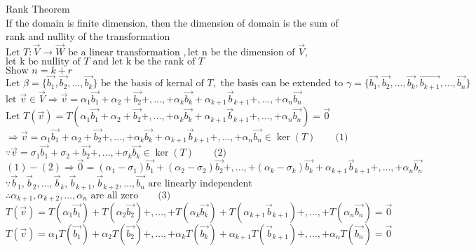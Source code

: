\documentclass{book}
\begin{document}
\noindent
Rank Theorem\\
If the domain is finite dimension, then the dimension of domain is the sum of rank and nullity of the transformation\\
$\text{Let } T:\vec{V} \rightarrow \vec{W} \text{ be a linear transformation },\text{let n be the dimension of }\vec{V},$\\
$\text{let k be nullity of }T \text{ and let k be the rank of }T$\\
$\text{Show } n = k + r$\\

$\text{Let }\beta = \{ \vec{b_1}, \vec{b_2},...,\vec{b_k}\} \text{ be the basis of kernal of }T, \text{ the basis can be extended to } \gamma = \{ \vec{b_1}, \vec{b_2},...,\vec{b_k}, \vec{b_{k+1}},...,\vec{b_n}\}$\\
$\text{let }\vec{v} \in \vec{V} \Rightarrow \vec{v} = \alpha_1 \vec{b_1} + \alpha_2 + \vec{b_2} +,..., + \alpha_k \vec{b_k} + \alpha_{k+1}\vec{b}_{k+1}+,...,+\alpha_{n}\vec{b_n}$\\
$\text{Let }T(\vec{v}) = T(\alpha_1 \vec{b_1} + \alpha_2 + \vec{b_2} +,..., + \alpha_k \vec{b_k} + \alpha_{k+1}\vec{b}_{k+1}+,...,+\alpha_{n}\vec{b_n}) = \vec{0}$\\
$\Rightarrow \vec{v} = \alpha_1 \vec{b_1} + \alpha_2 + \vec{b_2} +,..., + \alpha_k \vec{b_k} + \alpha_{k+1}\vec{b}_{k+1}+,...,+\alpha_{n}\vec{b_n} \in \ker(T) \quad\quad \text{(1)}$\\
$\because \vec{v} = \sigma_1 \vec{b_1} + \sigma_2 + \vec{b_2} +,..., + \sigma_k \vec{b_k} \in \ker(T) \quad\quad \text{(2)}$\\
$(1) - (2) \Rightarrow \vec{0} = (\alpha_1-\sigma_1)\vec{b_1} + (\alpha_2 - \sigma_2)\vec{b_2}+,...,+ (\alpha_k - \sigma_k)\vec{b_k}+   \alpha_{k+1}\vec{b}_{k+1}+,...,+\alpha_{n}\vec{b_n} $\\
$\because \vec{b}_{1}, \vec{b}_{2},...,\vec{b}_{k},\vec{b}_{k+1}, \vec{b}_{k+2},...,\vec{b_n} \text{ are linearly independent}$\\
$\therefore \alpha_{k+1}, \alpha_{k+2}, ... , \alpha_{n} \text{ are all zero} \quad\quad \text{(3)}$\\
$T(\vec{v}) = T(\alpha_1 \vec{b_1}) + T(\alpha_2 \vec{b_2}) +,..., + T(\alpha_k \vec{b_k}) + T(\alpha_{k+1}\vec{b}_{k+1})+,...,+T(\alpha_{n}\vec{b_n}) = \vec{0}$\\
$T(\vec{v}) = \alpha_1 T(\vec{b_1}) + \alpha_2 T(\vec{b_2}) +,..., + \alpha_k T(\vec{b_k}) + \alpha_{k+1}T(\vec{b}_{k+1})+,...,+\alpha_{n}T(\vec{b_n}) = \vec{0}$\\
\end{document}
